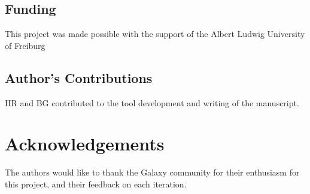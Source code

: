 \documentclass[a4paper,num-refs]{oup-contemporary}
\begin{document}
\subsection{Funding}
This project was made possible with the support of the Albert Ludwig University of Freiburg

\subsection{Author's Contributions}
HR and BG contributed to the tool development and writing of the manuscript.

\section{Acknowledgements}
The authors would like to thank the Galaxy community for their enthusiasm for this project, and their feedback on each iteration.


\end{document}

